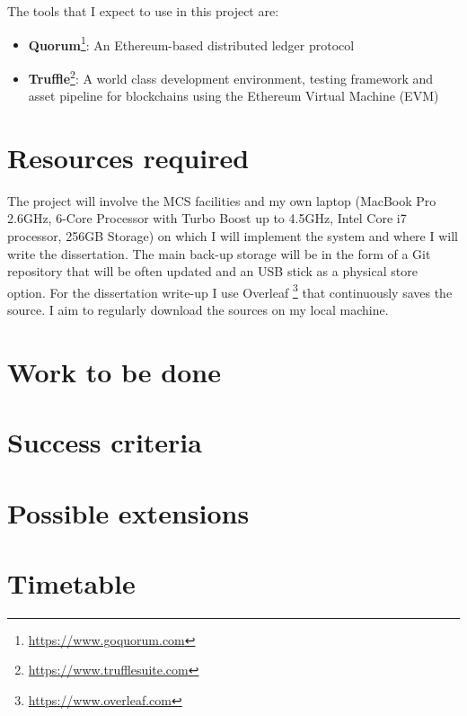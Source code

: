 \documentclass[12p]{report}
\begin{document}
\begin{itemize}[label={},leftmargin=-20mm]
\begin{large}
\hspace{3mm} The tools that I expect to use in this project are:
\begin{itemize}[label={$\bullet$}, leftmargin=15mm]

\item{{\bf Quorum}\footnote{\url{https://www.goquorum.com}}: An Ethereum-based distributed ledger protocol}

\item{{\bf Truffle}\footnote{\url{https://www.trufflesuite.com}}: A world class development environment, testing framework and asset pipeline for blockchains using the Ethereum Virtual Machine (EVM) }

\end{itemize}

\section*{\LARGE Resources required} 
\hspace{3mm} The project will involve the MCS facilities and my own laptop (MacBook Pro 2.6GHz, 6-Core Processor with Turbo Boost up to 4.5GHz, Intel Core i7 processor, 256GB Storage) on which I will implement the system and where I will write the dissertation. The main back-up storage will be in the form of a Git repository that will be often updated and an USB stick as a physical store option. For the dissertation write-up I use Overleaf {\footnote{\url{https://www.overleaf.com}}} that continuously saves the source. I aim to regularly download the sources on my local machine.

\section*{\LARGE Work to be done}


\section*{\LARGE Success criteria}


\section*{\LARGE Possible extensions}

\section*{\LARGE Timetable}


\end{large}
\end{itemize}
\end{document}
